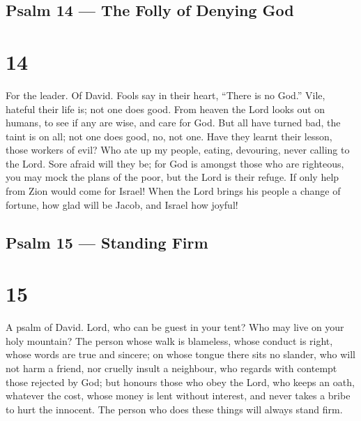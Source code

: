 \hypertarget{psalm-14-the-folly-of-denying-god}{%
\subsection{Psalm 14 --- The Folly of Denying
God}\label{psalm-14-the-folly-of-denying-god}}

\hypertarget{section-13}{%
\section{14}\label{section-13}}

For the leader. Of David.  Fools say in their heart, ``There
is no God.'' Vile, hateful their life is; not one does good.
 From heaven the Lord looks out on humans, to see if any are
wise, and care for God.  But all have turned bad, the taint
is on all; not one does good, no, not one.  Have they learnt
their lesson, those workers of evil? Who ate up my people, eating,
devouring, never calling to the Lord.  Sore afraid will they
be; for God is amongst those who are righteous,  you may
mock the plans of the poor, but the Lord is their refuge. 
If only help from Zion would come for Israel! When the Lord brings his
people a change of fortune, how glad will be Jacob, and Israel how
joyful!

\hypertarget{psalm-15-standing-firm}{%
\subsection{Psalm 15 --- Standing Firm}\label{psalm-15-standing-firm}}

\hypertarget{section-14}{%
\section{15}\label{section-14}}

A psalm of David.  Lord, who can be guest in your tent? Who
may live on your holy mountain?  The person whose walk is
blameless, whose conduct is right, whose words are true and sincere;
 on whose tongue there sits no slander, who will not harm a
friend,  nor cruelly insult a neighbour, who regards with
contempt those rejected by God; but honours those who obey the Lord, who
keeps an oath, whatever the cost,  whose money is lent
without interest, and never takes a bribe to hurt the innocent. The
person who does these things will always stand firm.

